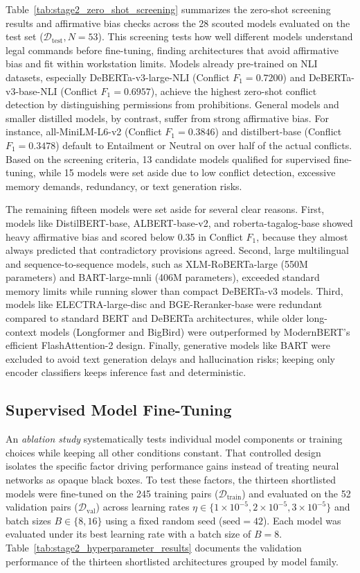 Table~\ref{tab:stage2_zero_shot_screening} summarizes the zero-shot screening results and affirmative bias checks across the 28 scouted models evaluated on the test set ($\mathcal{D}_{\text{test}}, N = 53$). This screening tests how well different models understand legal commands before fine-tuning, finding architectures that avoid affirmative bias and fit within workstation limits. Models already pre-trained on NLI datasets, especially DeBERTa-v3-large-NLI (Conflict $F_1 = 0.7200$) and DeBERTa-v3-base-NLI (Conflict $F_1 = 0.6957$), achieve the highest zero-shot conflict detection by distinguishing permissions from prohibitions. General models and smaller distilled models, by contrast, suffer from strong affirmative bias. For instance, all-MiniLM-L6-v2 (Conflict $F_1 = 0.3846$) and distilbert-base (Conflict $F_1 = 0.3478$) default to Entailment or Neutral on over half of the actual conflicts. Based on the screening criteria, 13 candidate models qualified for supervised fine-tuning, while 15 models were set aside due to low conflict detection, excessive memory demands, redundancy, or text generation risks.

The remaining fifteen models were set aside for several clear reasons. First, models like DistilBERT-base, ALBERT-base-v2, and roberta-tagalog-base showed heavy affirmative bias and scored below 0.35 in Conflict $F_1$, because they almost always predicted that contradictory provisions agreed. Second, large multilingual and sequence-to-sequence models, such as XLM-RoBERTa-large (550M parameters) and BART-large-mnli (406M parameters), exceeded standard memory limits while running slower than compact DeBERTa-v3 models. Third, models like ELECTRA-large-disc and BGE-Reranker-base were redundant compared to standard BERT and DeBERTa architectures, while older long-context models (Longformer and BigBird) were outperformed by ModernBERT's efficient FlashAttention-2 design. Finally, generative models like BART were excluded to avoid text generation delays and hallucination risks; keeping only encoder classifiers keeps inference fast and deterministic.


\subsection{Supervised Model Fine-Tuning}
An \textit{ablation study} systematically tests individual model components or training choices while keeping all other conditions constant. That controlled design isolates the specific factor driving performance gains instead of treating neural networks as opaque black boxes. To test these factors, the thirteen shortlisted models were fine-tuned on the 245 training pairs ($\mathcal{D}_{\text{train}}$) and evaluated on the 52 validation pairs ($\mathcal{D}_{\text{val}}$) across learning rates $\eta \in \{1\times 10^{-5}, 2\times 10^{-5}, 3\times 10^{-5}\}$ and batch sizes $B \in \{8, 16\}$ using a fixed random seed ($\text{seed} = 42$). Each model was evaluated under its best learning rate with a batch size of $B = 8$. Table~\ref{tab:stage2_hyperparameter_results} documents the validation performance of the thirteen shortlisted architectures grouped by model family.

